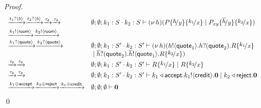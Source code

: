 \begin{proof}
\[\begin{array}{ll}
		\by{\bactinp{t_1}{b}} \by{\bactinp{t_2}{b}} \by{\dtau}\by{\dtau}&
		\es; \es; k_1: S \cat k_2: S \proves \newsp{h}{
		P\subst{h}{y} \subst{k_1}{x} \Par P_{xy}\subst{\dual{h}}{y} \subst{k_2}{x}}
\\[1mm]

		\by{\bactout{k_1}{\rtype}} \by{\bactout{k_2}{\rtype}}\\
		\by{\bactinp{k_1}{\Quote}} \by{\bactinp{k_2}{\Quote}}
		& \es; \es; k_1: S' \cat k_2: S' \proves \newsp{h}{
		\bout{h}{\Quote_1} \binp{h}{\Quote_2} R \subst{k_1}{x} \\
		& \Par \binp{\dual{h}}{\Quote_2} \bout{\dual{h}}{\Quote_1} R \subst{k_2}{x}}
\\[1mm]
		\by{\dtau} \by{\dtau}&
		\es; \es; k_1: S' \cat k_2: S' \proves R \subst{k_1}{x} \Par R \subst{k_2}{x}
\\[1mm]
		\by{\dtau} \by{\dtau}&
		\es; \es; k_1: S' \cat k_2: S' \proves
		\bsel{k_1}{\accept} \bout{k_1}{\creditc} \inact 
		\Par \bsel{k_2}{\reject} \inact
\\[1mm]
		\by{\bactsel{k_1}{\accept}} \by{\bactsel{k_2}{\reject}} \by{\bactsel{k_1}{\creditc}}&
		\es; \es; \es \proves \inact
	\end{array}
\]
\qed
\end{proof}







